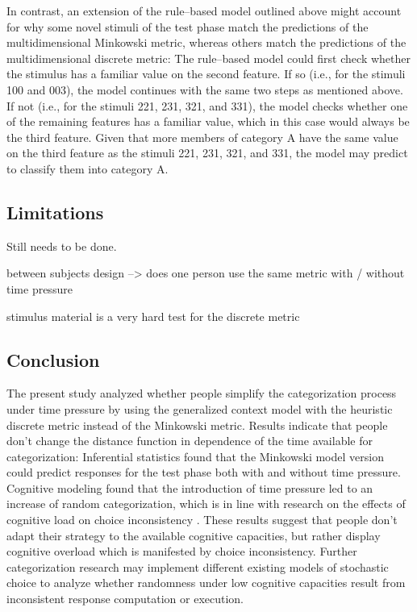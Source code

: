\documentclass[a4paper,man,natbib]{apa6}
\begin{document}
In contrast, an extension of the rule--based model outlined above might account for why some novel stimuli of the test phase match the predictions of the multidimensional Minkowski metric, whereas others match the predictions of the multidimensional discrete metric: The rule--based model could first check whether the stimulus has a familiar value on the second feature. If so (i.e., for the stimuli 100 and 003), the model continues with the same two steps as mentioned above. If not (i.e., for the stimuli 221, 231, 321, and 331), the model checks whether one of the remaining features has a familiar value, which in this case would always be the third feature. Given that more members of category A have the same value on the third feature as the stimuli 221, 231, 321, and 331, the model may predict to classify them into category A. 

\subsection{Limitations}
Still needs to be done.

between subjects design --> does one person use the same metric with / without time pressure

stimulus material is a very hard test for the discrete metric

\subsection{Conclusion}
The present study analyzed whether people simplify the categorization process under time pressure by using the generalized context model \citep{nosofsky1986attention} with the heuristic discrete metric instead of the Minkowski metric. Results indicate that people don't change the distance function in dependence of the time available for categorization: Inferential statistics found that the Minkowski model version could predict responses for the test phase both with and without time pressure. Cognitive modeling found that the introduction of time pressure led to an increase of random categorization, which is in line with research on the effects of cognitive load on choice inconsistency \citep{olschewski2018taxing}. These results suggest that people don't adapt their strategy to the available cognitive capacities, but rather display cognitive overload which is manifested by choice inconsistency. Further categorization research may implement different existing models of stochastic choice \citep{blavatskyy2010models, becker1963stochastic} to analyze whether randomness under low cognitive capacities result from inconsistent response computation or execution.


\end{document}
